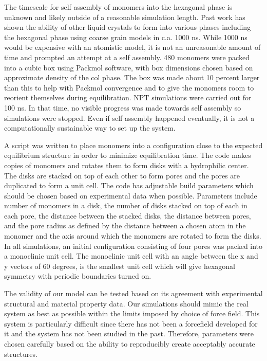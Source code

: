 \documentclass{article}
\begin{document}
	The timescale for self assembly of monomers into the hexagonal phase is unknown and likely outside of a reasonable simulation length. Past work has shown the ability of other liquid crystals to form into various phases including the hexagonal phase using coarse grain models in c.a. 1000 ns. While 1000 ns would be expensive with an atomistic model, it is not an unreasonable amount of time and prompted an attempt at a self assembly. 480 monomers were packed into a cubic box using Packmol software, with box dimensions chosen based on approximate density of the col phase. The box was made about 10 percent larger than this to help with Packmol convergence and to give the monomers room to reorient themselves during equilibration. NPT simulations were carried out for 100 ns. In that time, no visible progress was made towards self assembly so simulations were stopped. Even if self assembly happened eventually, it is not a computationally sustainable way to set up the system.

	A script was written to place monomers into a configuration close to the expected equilibrium structure in order to minimize equilibration time. The code makes copies of monomers and rotates them to form disks with a hydrophilic center. The disks are stacked on top of each other to form pores and the pores are duplicated to form a unit cell. The code has adjustable build parameters which should be chosen based on experimental data when possible. Parameters include number of monomers in a disk, the number of disks stacked on top of each in each pore, the distance between the stacked disks, the distance between pores, and the pore radius as defined by the distance between a chosen atom in the monomer and the axis around which the monomers are rotated to form the disks. In all simulations, an initial configuration consisting of four pores was packed into a monoclinic unit cell. The monoclinic unit cell with an angle between the x and y vectors of 60 degrees, is the smallest unit cell which will give hexagonal symmetry with periodic boundaries turned on. 

        The validity of our model can be tested based on its agreement with experimental structural and material property data. Our simulations should mimic the real system as best as possible within the limits imposed by choice of force field. This system is particularly difficult since there has not been a forcefield developed for it and the system has not been studied in the past. Therefore, parameters were chosen carefully based on the ability to reproducibly create acceptably accurate structures. 
\end{document}
